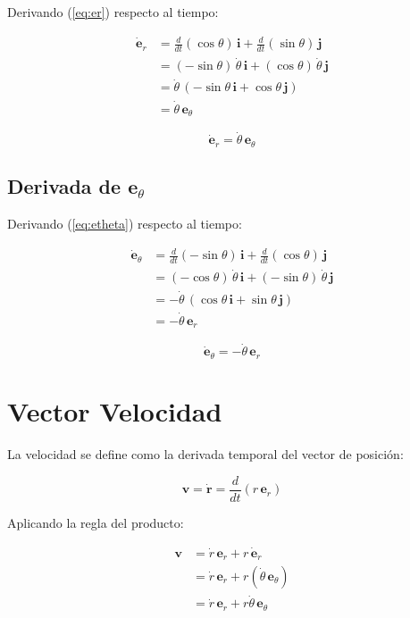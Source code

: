 \documentclass[12pt,a4paper]{article}
\begin{document}
Derivando (\ref{eq:er}) respecto al tiempo:

\begin{align*}
    \dot{\mathbf{e}}_r &= \frac{d}{dt}(\cos\theta)\,\mathbf{i} + \frac{d}{dt}(\sin\theta)\,\mathbf{j} \\
    &= (-\sin\theta)\,\dot{\theta}\,\mathbf{i} + (\cos\theta)\,\dot{\theta}\,\mathbf{j} \\
    &= \dot{\theta}\,(-\sin\theta\,\mathbf{i} + \cos\theta\,\mathbf{j}) \\
    &= \dot{\theta}\,\mathbf{e}_\theta
\end{align*}

\begin{equation}
    \boxed{\dot{\mathbf{e}}_r = \dot{\theta}\,\mathbf{e}_\theta}
    \label{eq:der_er}
\end{equation}

\subsection{Derivada de $\mathbf{e}_\theta$}

Derivando (\ref{eq:etheta}) respecto al tiempo:

\begin{align*}
    \dot{\mathbf{e}}_\theta &= \frac{d}{dt}(-\sin\theta)\,\mathbf{i} + \frac{d}{dt}(\cos\theta)\,\mathbf{j} \\
    &= (-\cos\theta)\,\dot{\theta}\,\mathbf{i} + (-\sin\theta)\,\dot{\theta}\,\mathbf{j} \\
    &= -\dot{\theta}\,(\cos\theta\,\mathbf{i} + \sin\theta\,\mathbf{j}) \\
    &= -\dot{\theta}\,\mathbf{e}_r
\end{align*}

\begin{equation}
    \boxed{\dot{\mathbf{e}}_\theta = -\dot{\theta}\,\mathbf{e}_r}
    \label{eq:der_etheta}
\end{equation}

\section{Vector Velocidad}

La velocidad se define como la derivada temporal del vector de posición:

\[
\mathbf{v} = \dot{\mathbf{r}} = \frac{d}{dt}(r\,\mathbf{e}_r)
\]

Aplicando la regla del producto:

\begin{align*}
    \mathbf{v} &= \dot{r}\,\mathbf{e}_r + r\,\dot{\mathbf{e}}_r \\
    &= \dot{r}\,\mathbf{e}_r + r(\dot{\theta}\,\mathbf{e}_\theta) \\
    &= \dot{r}\,\mathbf{e}_r + r\dot{\theta}\,\mathbf{e}_\theta
\end{align*}
\end{document}
